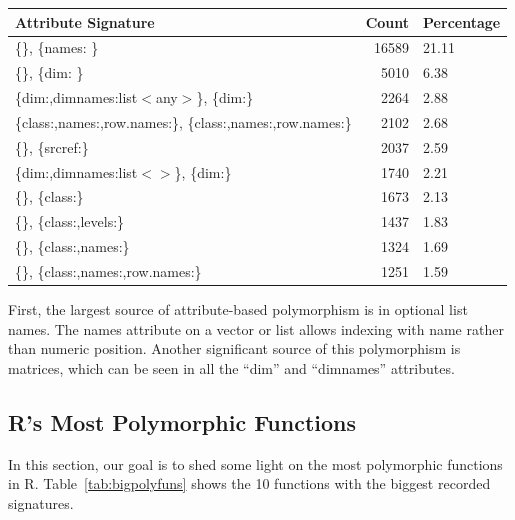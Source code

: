 \documentclass[acmsmall,10pt,review,anonymous]{acmart}\settopmatter{printfolios=true,printccs=false,printacmref=false}
\begin{document}
\begin{table}[ht]
\label{tab:topattrpoly}
\centering
\begin{tabular}{lrl}
  \hline
Attribute Signature & Count & Percentage \\
  \hline
\{\}, \{names: \C\} & 16589 & 21.11 \\
  \{\}, \{dim: \I\} & 5010 & 6.38 \\
  \{dim:\I,dimnames:list$<$any$>$\}, \{dim:\I\} & 2264 & 2.88 \\
  \{class:\C,names:\C,row.names:\C\}, \{class:\C,names:\C,row.names:\I\} & 2102 & 2.68 \\
  \{\}, \{srcref:\I\} & 2037 & 2.59 \\
  \{dim:\I,dimnames:list$<$\C$>$\}, \{dim:\I\} & 1740 & 2.21 \\
  \{\}, \{class:\C\} & 1673 & 2.13 \\
  \{\}, \{class:\C,levels:\C\} & 1437 & 1.83 \\
  \{\}, \{class:\C,names:\C\} & 1324 & 1.69 \\
  \{\}, \{class:\C,names:\C,row.names:\I\} & 1251 & 1.59 \\
   \hline
\end{tabular}
\end{table}

First, the largest source of attribute-based polymorphism is in optional list names.
The names attribute on a vector or list allows indexing with name rather than numeric position.
Another significant source of this polymorphism is matrices, which can be seen in all the ``dim'' and ``dimnames'' attributes.


%
%
%
%
\subsection{R's Most Polymorphic Functions}


In this section, our goal is to shed some light on the most polymorphic functions in R.
Table~\ref{tab:bigpolyfuns} shows the 10 functions with the biggest recorded signatures.
\end{document}
